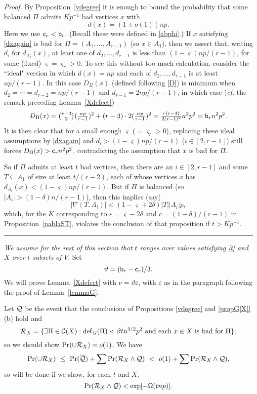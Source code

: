 \documentclass[letterpaper,11pt]{article}
\newcommand{\beq}[1]{\begin{equation}\label{#1}}
\newcommand{\enq}[0]{\end{equation}}
\newcommand{\mn}[0]{\medskip\noindent}
\newcommand{\sub}[0]{\subseteq}
\renewcommand{\dots}[0]{,\ldots,}
\newcommand{\ov}[0]{\overline}
\newcommand{\cee}[0]{{\cal C}}
\newcommand{\Q}[0]{{\cal Q}}
\newcommand{\R}[0]{{\cal R}}
\newcommand{\deff}[0]{{\rm def}}
\newcommand{\cc}[0]{\mbox{{\sf c}}}
\newcommand{\bbb}[0]{\mbox{{\sf b}}}
\newcommand{\0}[0]{\emptyset}
\renewcommand{\qed}[0]{\begin{flushright} \rule{2mm}{3mm} \end{flushright}}
\newcommand{\Cc}[0]{\tbinom}
\newcommand{\gd}[0]{\delta }
\newcommand{\gO}[0]{\Omega}
\newcommand{\eps}[0]{\varepsilon }
\newcommand{\vt}[0]{\vartheta}
\newcommand{\vs}[0]{\varsigma}
\begin{document}
%
\mn
{\em Proof.}
By Proposition~\ref{vdegree} it is enough to bound the
probability that some balanced $\Pi$
admits
$Kp^{-1}$ bad vertices $x$ with
\beq{dxagain}
d(x) = (1\pm o(1))np.
\enq
Here we use $\cc_r< \bbb_r$.
(Recall these were defined in \eqref{abphi}.)
If
$x$ satisfying \eqref{dxagain} is bad for $\Pi=(A_1\dots A_{r-1})$
(so $x\in A_1$),
then we assert that, writing $d_i $ for $d_{A_i}(x)$,
at least one of $d_2\dots d_{r-1}$
is less than $(1-\vs)np/(r-1)$,
for some (fixed) $\vs=\vs_r>0$.  To see this without too much calculation,
consider the ``ideal" version in which $d(x)=np$
and each of $d_2\dots d_{r-1}$ is at least
$np/(r-1)$.  In this case $D_\Pi(x)$
(defined following \eqref{D})
is minimum
when $d_2=\cdots =d_{r-2}=np/(r-1)$ and $d_{r-1}= 2np/(r-1)$,
in which case
({\em cf.} the remark preceding Lemma~\ref{Xdefect})
\[
D_\Pi(x) =
\Cc{r-3}{2}(\tfrac{np}{r-1})^2 + (r-3)\cdot 2(\tfrac{np}{r-1})^2
= \tfrac{r(r-3)}{2(r-1)^2}n^2p^2 = \bbb_rn^2p^2.
\]
It is then clear that for a small enough
$\vs$ ($=\vs_r>0$),
replacing these ideal assumptions by
\eqref{dxagain} and $d_i> (1-\vs)np/(r-1)$
($i\in [2,r-1]$)
still forces
$D_\Pi(x) > \cc_r n^2p^2$, contradicting the assumption
that $x$ is bad for $\Pi$.

So if $\Pi$ admits at least $t$ bad vertices,
then there are an $i\in [2,r-1]$ and some
$T\sub A_1$ of size at least $t/(r-2)$, each of whose vertices
$x$ has $d_{A_i}(x)<(1-\vs)np/(r-1)$.  But if $\Pi$ is
balanced (so $|A_i|>(1-\gd)n/(r-1)$),
then this implies (say)
\[
|\nabla(T,A_i)| < (1-\vs+2\gd) |T||A_i|p,
\]
which, for the $K$ corresponding to $\eps = \vs-2\gd$
and $c = (1-\gd)/(r-1)$ in Proposition~\ref{nablaST},
violates the conclusion of that proposition
if $t > Kp^{-1}$.
\qed




\medskip
{\em We assume for the rest of
this section that $t$ ranges over values
satisfying \eqref{t}
and
$X$ over $t$-subsets of $V$}.
%
Set
\[\vt = (\bbb_r-\cc_r)/3.\]
We will prove Lemma~\ref{Xdefect} with $\nu =\vt \eps$, with
$\eps$ as in the paragraph following the proof of Lemma~\ref{lemmaG}.



Let $\Q$ be the event that the conclusions of
Propositions \ref{vdegree} and \ref{propG[X]}(b)
hold and
%
\[\R_X =\{\exists
\Pi\in \cee(X):
\deff_G(\Pi)<\vt tn^{3/2}p^2 ~\mbox{and each $x\in X$
is bad for $\Pi$}\};\]
%
so we should show
$\Pr(\cup \R_X) =o(1) $.
We have
\beq{PrU}
\Pr(\cup \R_X) ~\leq ~\Pr(\ov{\Q}) + \sum\Pr(\R_X\wedge\Q)
~<~ o(1)+ \sum\Pr(\R_X\wedge\Q),
\enq
so
will be done if we show, for each $t$ and $X$,
\beq{QXD}
\Pr(\R_X\wedge\Q) < \exp[-\gO(tnp)].
\enq
\end{document}

